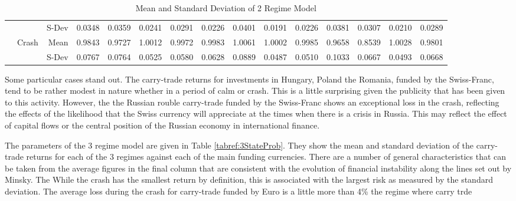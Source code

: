 \documentclass[12pt, a4paper, oneside]{article} %
\begin{document}
\begin{landscape}
\begin{table}[ht]
\begin{tabular}{llrrrrrrrrrrrrr}
 & & S-Dev &0.0348 & 0.0359 & 0.0241 & 0.0291 & 0.0226 & 0.0401 & 0.0191 & 0.0226 & 0.0381 & 0.0307 & 0.0210 & 0.0289 \\ 
  & \multirow{2}{*}{Crash}&Mean & 0.9843 & 0.9727 & 1.0012 & 0.9972 & 0.9983 & 1.0061 & 1.0002 & 0.9985 & 0.9658 & 0.8539 & 1.0028 & 0.9801 \\ 
  & & S-Dev& 0.0767 & 0.0764 & 0.0525 & 0.0580 & 0.0628 & 0.0889 & 0.0487 & 0.0510 & 0.1033 & 0.0667 & 0.0493 & 0.0668 \\ 
   \hline
\end{tabular}
\caption{Mean and Standard Deviation of 2 Regime Model}
\end{table}
\label{tabref:2StateProb}
\end{landscape}

Some particular cases stand out. The carry-trade returns for investments in Hungary, Poland the Romania, funded by the Swiss-Franc, tend to be rather modest in nature whether in a period of calm or crash. This is a little surprising given the publicity that has been given to this activity.  However, the the Russian rouble carry-trade funded by the Swiss-Franc shows an exceptional loss in the crash, reflecting the effects of the likelihood that the Swiss currency will appreciate at the times when there is a crisis in Russia.  This may reflect the effect of capital flows or the central position of the Russian economy in international finance. 


The parameters of the 3 regime model are given in Table \ref{tabref:3StateProb}.  They show the mean and standard deviation of the carry-trade returns for each of the 3 regimes against each of the main funding currencies.  There are a number of general characteristics that can be taken from the average figures in the final column that are consistent with the evolution of financial instability along the lines set out by Minsky.  The While the crash has the smallest return by definition, this is associated with the largest risk as measured by the standard deviation. The average loss during the crash for carry-trade funded by Euro is a little more than 4\%  the regime where carry trde 
\end{document}
